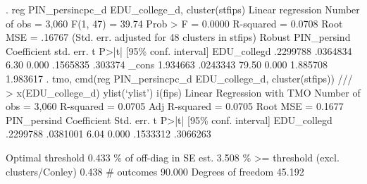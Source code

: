 . reg PIN_persincpc_d EDU_college_d, cluster(stfips)
{\smallskip}
Linear regression                               Number of obs     =      3,060
                                                F(1, 47)          =      39.74
                                                Prob > F          =     0.0000
                                                R-squared         =     0.0708
                                                Root MSE          =     .16767
{\smallskip}
                                (Std. err. adjusted for 48 clusters in stfips)
             {\VBAR}               Robust
PIN_persin{\tytilde}d {\VBAR} Coefficient  std. err.      t    P>|t|     [95\% conf. interval]
EDU_colleg{\tytilde}d {\VBAR}   .2299788   .0364834     6.30   0.000     .1565835     .303374
       _cons {\VBAR}   1.934663   .0243343    79.50   0.000     1.885708    1.983617
{\smallskip}
. tmo, cmd(reg PIN_persincpc_d EDU_college_d, cluster(stfips)) ///
>     x(EDU_college_d) ylist(`ylist') i(fips)
{\smallskip}
Linear Regression with TMO                              Number of obs =  3,060
                                                        R-squared     = 0.0705
                                                        Adj R-squared = 0.0705
                                                        Root MSE      = 0.1677
{\smallskip}
PIN_persin{\tytilde}d {\VBAR} Coefficient  Std. err.      t    P>|t|     [95\% conf. interval]
EDU_colleg{\tytilde}d {\VBAR}   .2299788   .0381001     6.04   0.000     .1533312    .3066263
                                                                               
                                                   Optimal threshold      0.433
                                            \% of off-diag in SE est.      3.508
                              \% >= threshold (excl. clusters/Conley)      0.438
                                                          \# outcomes     90.000
                                                  Degrees of freedom     45.192
